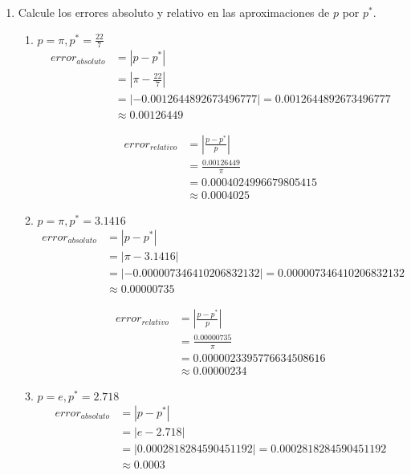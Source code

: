 \documentclass[12pt]{article}
\begin{document}
\begin{enumerate}
    \item Calcule los errores absoluto y relativo en las aproximaciones de \(p\) por \(p^{*}\).
    \begin{enumerate}[label=\alph*.]
        \item \(p = \pi, p^{*} = \frac{22}{7}\)
        \[
        \begin{aligned}
            error_{absoluto} &= \left| p - p^{*}\right| \\
                             &= \left| \pi - \frac{22}{7} \right| \\
                             &= \left|-0.0012644892673496777\right| = 0.0012644892673496777 \\
                             &\approx 0.00126449
        \end{aligned}
        \]

        \[
        \begin{aligned}
            error_{relativo} &= \left| \frac{p - p^{*}}{p}\right| \\
                             &= \frac{0.00126449}{\pi } \\
                             &= 0.0004024996679805415 \\
                             &\approx 0.0004025
        \end{aligned}
        \]
        \item \(p = \pi, p^{*} = 3.1416\)
        \[
            \begin{aligned}
                error_{absoluto} &= \left| p - p^{*}\right| \\
                                 &= \left| \pi - 3.1416 \right| \\
                                 &= \left|-0.000007346410206832132\right| = 0.000007346410206832132 \\
                                 &\approx 0.00000735
            \end{aligned}
            \]
    
            \[
            \begin{aligned}
                error_{relativo} &= \left| \frac{p - p^{*}}{p}\right| \\
                                 &= \frac{0.00000735}{\pi} \\
                                 &= 0.0000023395776634508616 \\
                                 &\approx 0.00000234
            \end{aligned}
        \]
        \item \(p = e, p^{*} = 2.718\)
        \[
            \begin{aligned}
                error_{absoluto} &= \left| p - p^{*}\right| \\
                                 &= \left| e - 2.718 \right| \\
                                 &= \left|0.0002818284590451192\right| = 0.0002818284590451192 \\
                                 &\approx 0.0003
            \end{aligned}
            \]
    

\end{enumerate}
\end{enumerate}
\end{document}
